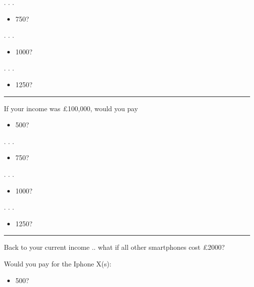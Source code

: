 \documentclass[]{article}
\providecommand{\tightlist}{%
  \setlength{\itemsep}{0pt}\setlength{\parskip}{0pt}}
\begin{document}
. . .

\begin{itemize}
\tightlist
\item
  750?
\end{itemize}

. . .

\begin{itemize}
\tightlist
\item
  1000?
\end{itemize}

. . .

\begin{itemize}
\tightlist
\item
  1250?
\end{itemize}

\begin{center}\rule{0.5\linewidth}{\linethickness}\end{center}

If your income was \pounds 100,000, would you pay

\begin{itemize}
\tightlist
\item
  500?
\end{itemize}

. . .

\begin{itemize}
\tightlist
\item
  750?
\end{itemize}

. . .

\begin{itemize}
\tightlist
\item
  1000?
\end{itemize}

. . .

\begin{itemize}
\tightlist
\item
  1250?
\end{itemize}

\begin{center}\rule{0.5\linewidth}{\linethickness}\end{center}

Back to your current income .. what if all other smartphones cost
\pounds 2000?

Would you pay for the Iphone X(s):

\begin{itemize}
\tightlist
\item
  500?
\end{itemize}
\end{document}
